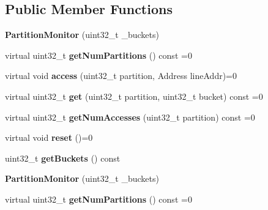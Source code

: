 \subsection*{Public Member Functions}
\begin{DoxyCompactItemize}
\item 
\hypertarget{classPartitionMonitor_ae73b922c20ccfebc1f033771143f81e3}{{\bfseries Partition\-Monitor} (uint32\-\_\-t \-\_\-buckets)}\label{classPartitionMonitor_ae73b922c20ccfebc1f033771143f81e3}

\item 
\hypertarget{classPartitionMonitor_ad8d8b89fc2e2f43448bcdacfbdd18dbc}{virtual uint32\-\_\-t {\bfseries get\-Num\-Partitions} () const =0}\label{classPartitionMonitor_ad8d8b89fc2e2f43448bcdacfbdd18dbc}

\item 
\hypertarget{classPartitionMonitor_ad8069e2e85d1258e0048cd3063897a43}{virtual void {\bfseries access} (uint32\-\_\-t partition, Address line\-Addr)=0}\label{classPartitionMonitor_ad8069e2e85d1258e0048cd3063897a43}

\item 
\hypertarget{classPartitionMonitor_a56745f29286e5ac23ce377d71b959226}{virtual uint32\-\_\-t {\bfseries get} (uint32\-\_\-t partition, uint32\-\_\-t bucket) const =0}\label{classPartitionMonitor_a56745f29286e5ac23ce377d71b959226}

\item 
\hypertarget{classPartitionMonitor_a0fc28e3e100251f131f5232c405d0495}{virtual uint32\-\_\-t {\bfseries get\-Num\-Accesses} (uint32\-\_\-t partition) const =0}\label{classPartitionMonitor_a0fc28e3e100251f131f5232c405d0495}

\item 
\hypertarget{classPartitionMonitor_ab12bee1a4397eb8ddf621e3bf58edea1}{virtual void {\bfseries reset} ()=0}\label{classPartitionMonitor_ab12bee1a4397eb8ddf621e3bf58edea1}

\item 
\hypertarget{classPartitionMonitor_a328f7bd7b831a8834e559d87bf554d92}{uint32\-\_\-t {\bfseries get\-Buckets} () const }\label{classPartitionMonitor_a328f7bd7b831a8834e559d87bf554d92}

\item 
\hypertarget{classPartitionMonitor_ae73b922c20ccfebc1f033771143f81e3}{{\bfseries Partition\-Monitor} (uint32\-\_\-t \-\_\-buckets)}\label{classPartitionMonitor_ae73b922c20ccfebc1f033771143f81e3}

\item 
\hypertarget{classPartitionMonitor_ad8d8b89fc2e2f43448bcdacfbdd18dbc}{virtual uint32\-\_\-t {\bfseries get\-Num\-Partitions} () const =0}\label{classPartitionMonitor_ad8d8b89fc2e2f43448bcdacfbdd18dbc}


\end{DoxyCompactItemize}
